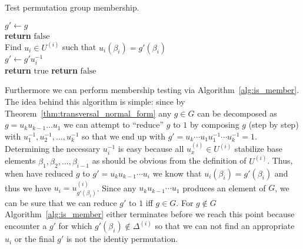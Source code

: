 %
\begin{algorithm}
  \caption{Test permutation group membership.}
  \label{alg:is_member}
  \begin{algorithmic}[1]
       \State $g' \gets g$
       \\
            \State \textbf{return} $\mathrm{false}$
          \EndIf
          \\
          \State Find $u_i \in U^{(i)}$ such that $u_i(\beta_i) = g'(\beta_i)$
          \\
          \State $g' \gets g' u_i^{-1}$
       \EndFor
       \\
         \State \textbf{return} $\mathrm{true}$
       \Else
         \State \textbf{return} $\mathrm{false}$
       \EndIf
    \EndProcedure
  \end{algorithmic}
\end{algorithm}

Furthermore we can perform membership testing via
Algorithm~\ref{alg:is_member}. The idea behind this algorithm is simple: since
by Theorem~\ref{thm:transversal_normal_form} any $g \in G$ can be decomposed as
$g = u_k u_{k-1} \dots u_1$ we can attempt to ``reduce'' $g$ to $1$ by
composing $g$ (step by step) with $u_1^{-1}, u_2^{-1}, \dots, u_k^{-1}$ so that
we end up with $g' = u_k \cdots u_1 u_1^{-1} \cdots u_k^{-1} = 1$.
%
Determining the necessary $u_i^{-1}$ is easy because
all $u_x^{(i)} \in U^{(i)}$ stabilize base elements $\beta_1, \beta_2, \dots,
\beta_{i-1}$ as should be obvious from the definition of $U^{(i)}$. Thus, when
have reduced $g$ to $g' = u_k u_{k-1} \cdots u_i$ we know that $u_i(\beta_i) =
g'(\beta_i)$ and thus we have $u_i = u_{g'(\beta_i)}^{(i)}$.
%
Since any $u_k u_{k-1} \cdots u_1$ produces an element of $G$, we can be
sure that we can reduce $g'$ to $1$ iff $g \in G$. For $g \notin G$
Algorithm~\ref{alg:is_member} either terminates before we reach this point
because encounter a $g'$ for which $g'(\beta_i) \notin
\Delta^{(i)}$ so that we can not find an appropriate $u_i$ or the final $g'$ is
not the identiy permutation.

